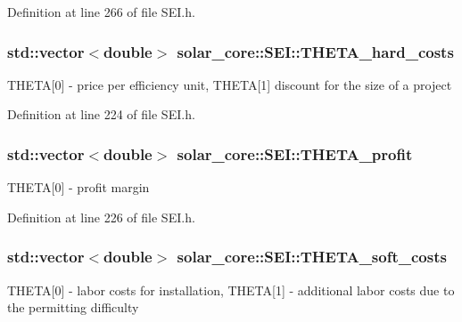 Definition at line 266 of file S\+E\+I.\+h.

\hypertarget{classsolar__core_1_1_s_e_i_a4723f6d0e5098b9b2f553c9ef6c5545f}{}
\subsubsection[{T\+H\+E\+T\+A\+\_\+hard\+\_\+costs}]{\setlength{\rightskip}{0pt plus 5cm}std\+::vector$<$double$>$ solar\+\_\+core\+::\+S\+E\+I\+::\+T\+H\+E\+T\+A\+\_\+hard\+\_\+costs\hspace{0.3cm}{\ttfamily [protected]}}\label{classsolar__core_1_1_s_e_i_a4723f6d0e5098b9b2f553c9ef6c5545f}
T\+H\+E\+T\+A\mbox{[}0\mbox{]} -\/ price per efficiency unit, T\+H\+E\+T\+A\mbox{[}1\mbox{]} discount for the size of a project 

Definition at line 224 of file S\+E\+I.\+h.

\hypertarget{classsolar__core_1_1_s_e_i_a9137f81a58ab1325d8b37590afe267aa}{}
\subsubsection[{T\+H\+E\+T\+A\+\_\+profit}]{\setlength{\rightskip}{0pt plus 5cm}std\+::vector$<$double$>$ solar\+\_\+core\+::\+S\+E\+I\+::\+T\+H\+E\+T\+A\+\_\+profit\hspace{0.3cm}{\ttfamily [protected]}}\label{classsolar__core_1_1_s_e_i_a9137f81a58ab1325d8b37590afe267aa}
T\+H\+E\+T\+A\mbox{[}0\mbox{]} -\/ profit margin 

Definition at line 226 of file S\+E\+I.\+h.

\hypertarget{classsolar__core_1_1_s_e_i_a1be690a943dc872af0ed3540c81f1d6b}{}
\subsubsection[{T\+H\+E\+T\+A\+\_\+soft\+\_\+costs}]{\setlength{\rightskip}{0pt plus 5cm}std\+::vector$<$double$>$ solar\+\_\+core\+::\+S\+E\+I\+::\+T\+H\+E\+T\+A\+\_\+soft\+\_\+costs\hspace{0.3cm}{\ttfamily [protected]}}\label{classsolar__core_1_1_s_e_i_a1be690a943dc872af0ed3540c81f1d6b}
T\+H\+E\+T\+A\mbox{[}0\mbox{]} -\/ labor costs for installation, T\+H\+E\+T\+A\mbox{[}1\mbox{]} -\/ additional labor costs due to the permitting difficulty 

